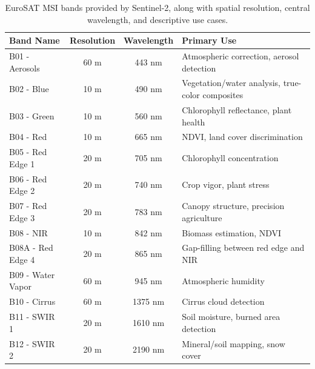 \documentclass[a4paper, oneside, english]{sapthesis} %
\begin{document}
\begin{table}[ht]
\centering
\scriptsize
    \begin{tabular}{lccl}
    \toprule
    \textbf{Band Name} & \textbf{Resolution} & \textbf{Wavelength} & \textbf{Primary Use} \\
    \midrule
    B01 - Aerosols & 60 m & 443 nm & Atmospheric correction, aerosol detection \\
    B02 - Blue & 10 m & 490 nm & Vegetation/water analysis, true-color composites \\
    B03 - Green & 10 m & 560 nm & Chlorophyll reflectance, plant health \\
    B04 - Red & 10 m & 665 nm & NDVI, land cover discrimination \\
    B05 - Red Edge 1 & 20 m & 705 nm & Chlorophyll concentration \\
    B06 - Red Edge 2 & 20 m & 740 nm & Crop vigor, plant stress \\
    B07 - Red Edge 3 & 20 m & 783 nm & Canopy structure, precision agriculture \\
    B08 - NIR & 10 m & 842 nm & Biomass estimation, NDVI \\
    B08A - Red Edge 4 & 20 m & 865 nm  & Gap-filling between red edge and NIR \\
    B09 - Water Vapor & 60 m & 945 nm & Atmospheric humidity \\
    B10 - Cirrus & 60 m & 1375 nm & Cirrus cloud detection \\
    B11 - SWIR 1 & 20 m & 1610 nm & Soil moisture, burned area detection \\
    B12 - SWIR 2 & 20 m & 2190 nm & Mineral/soil mapping, snow cover \\
    \bottomrule
    \end{tabular}
\vspace{0.3cm}
\caption{\normalsize EuroSAT MSI bands provided by Sentinel-2, along with spatial resolution, central wavelength, and descriptive use cases.}
\label{tab:sentinel2_bands}
\end{table}
\end{document}
